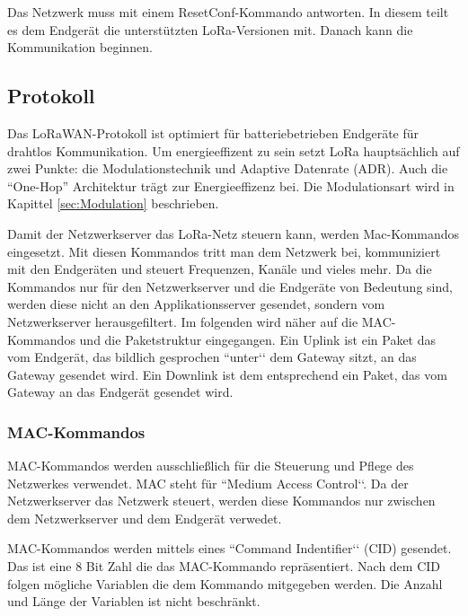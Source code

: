 \documentclass[a4paper, 12pt]{article}
\begin{document}
                Das Netzwerk muss  mit einem ResetConf-Kommando antworten. In diesem teilt es dem Endgerät die
                unterstützten LoRa-Versionen mit. Danach kann die Kommunikation beginnen.
        \subsection{Protokoll} \label{sec:protokoll}
            Das LoRaWAN-Protokoll ist optimiert für batteriebetrieben Endgeräte für drahtlos Kommunikation. 
            Um energieeffizent zu sein setzt LoRa hauptsächlich auf zwei Punkte: die Modulationstechnik und  
            Adaptive Datenrate (ADR). Auch die 
            ``One-Hop'' Architektur trägt zur Energieeffizenz bei. Die Modulationsart wird in Kapittel 
            \ref{sec:Modulation}  beschrieben. \cite[S,1 f]{LoRaClasses}


            Damit der Netzwerkserver das LoRa-Netz steuern kann, werden Mac-Kommandos eingesetzt. Mit diesen 
            Kommandos tritt man dem Netzwerk bei, kommuniziert mit den Endgeräten und steuert
            Frequenzen, Kanäle und vieles mehr.
            Da die Kommandos nur für den Netzwerkserver und die Endgeräte von Bedeutung sind, werden diese nicht an 
            den Applikationsserver gesendet, sondern vom Netzwerkserver herausgefiltert. Im folgenden wird näher auf 
            die MAC-Kommandos und die Paketstruktur eingegangen.
            Ein Uplink ist ein Paket das vom Endgerät, das bildlich gesprochen ``unter‘‘ dem Gateway sitzt, an das 
            Gateway gesendet wird. Ein Downlink ist dem entsprechend ein Paket, das vom Gateway an das Endgerät gesendet 
            wird.
            \subsubsection{MAC-Kommandos}
                MAC-Kommandos werden ausschließlich für die Steuerung und Pflege des Netzwerkes verwendet. MAC steht 
                für ``Medium Access Control‘‘. Da der Netzwerkserver das Netzwerk steuert, werden diese Kommandos nur 
                zwischen dem Netzwerkserver und dem Endgerät verwedet.

                MAC-Kommandos werden mittels eines ``Command Indentifier‘‘ (CID) gesendet. Das ist eine 8 Bit Zahl die 
                das MAC-Kommando repräsentiert. Nach dem CID folgen mögliche Variablen die dem Kommando mitgegeben 
                werden. Die Anzahl und Länge der Variablen ist nicht beschränkt.
                
\end{document}
